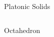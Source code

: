 \documentclass{beamer}
\begin{document}
\begin{frame}{Platonic Solids}
\begin{columns}
\begin{column}{0.32\textwidth}

      Octahedron
     \end{column}
    \begin{column}{0.32\textwidth}
      \centering
      


\end{column}
\end{columns}
\end{frame}
\end{document}
